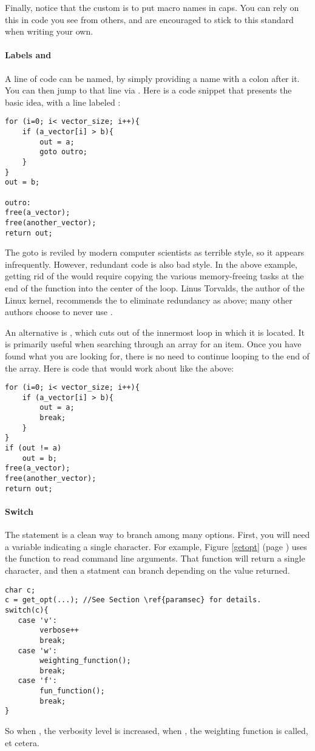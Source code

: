 Finally, notice that the custom is to put macro names in caps.  You can
rely on this in code you see from others, and are encouraged to stick
to this standard when writing your own.

\paragraph{Labels and } 
A line of code can be named, by simply providing a
name with a colon after it. You can then jump to that line via . Here is a code snippet that presents the basic idea, with a line labeled :
\begin{lstlisting}
for (i=0; i< vector_size; i++){
    if (a_vector[i] > b){
        out = a;
        goto outro;
    }
}
out = b;

outro:
free(a_vector);
free(another_vector);
return out;
\end{lstlisting}
The goto is reviled by modern computer scientists as terrible style, so
it appears infrequently. However, redundant code is also bad style. 
In the above example, getting rid of the  would require copying
the various memory-freeing tasks at the end of the function into the
center of the  loop.  Linus Torvalds,
the author of the Linux kernel, recommends the  to eliminate
redundancy as above; many other authors choose to never use .

An alternative is , which cuts out of the innermost loop in
which it is located. It is primarily useful when searching through an
array for an item. Once you have found what you are looking for, there
is no need to continue looping to the end of the array.
Here is code that would work about like the above:
\begin{lstlisting}
for (i=0; i< vector_size; i++){
    if (a_vector[i] > b){
        out = a;
        break;
    }
}
if (out != a)
    out = b;
free(a_vector);
free(another_vector);
return out;
\end{lstlisting}

\paragraph{Switch} The  statement is a
clean way to branch among many options. First, you will need a variable
indicating a single character. For example, Figure \ref{getopt} (page
\pageref{getopt}) uses the  function to read command line
arguments. That function will return a single character, and then a
 statment can branch depending on the value returned.
\lstset{texcl=true} %
\begin{lstlisting}
char c;
c = get_opt(...); //See Section \ref{paramsec} for details.
switch(c){
   case 'v':
        verbose++
        break;
   case 'w':    
        weighting_function();
        break;
   case 'f':      
        fun_function();
        break;
}
\end{lstlisting}
\lstset{texcl=false}
So when 
, the verbosity level is increased,
when , the weighting function is called, 
et cetera.

